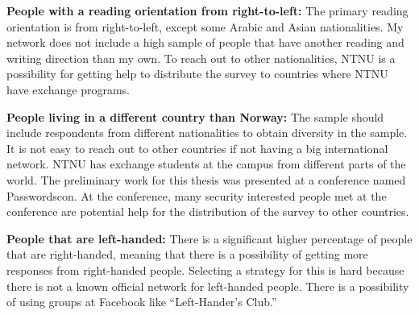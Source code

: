     {\bf People with a reading orientation from right-to-left:} 
    The primary reading orientation is from right-to-left, except some Arabic and Asian nationalities. My network does not include a high sample of people that have another reading and writing direction than my own. To reach out to other nationalities, NTNU is a possibility for getting help to distribute the survey to countries where NTNU have exchange programs. 
    
    {\bf People living in a different country than Norway:} 
    The sample should include respondents from different nationalities to obtain diversity in the sample. It is not easy to reach out to other countries if not having a big international network. NTNU has exchange students at the campus from different parts of the world. The preliminary work for this thesis was presented at a conference named Passwordscon. At the conference, many security interested people met at the conference are potential help for the distribution of the survey to other countries. 

    {\bf People that are left-handed:} 
    There is a significant higher percentage of people that are right-handed, meaning that there is a possibility of getting more responses from right-handed people. Selecting a strategy for this is hard because there is not a known official network for left-handed people. There is a possibility of using groups at Facebook like ``Left-Hander's Club.''
    